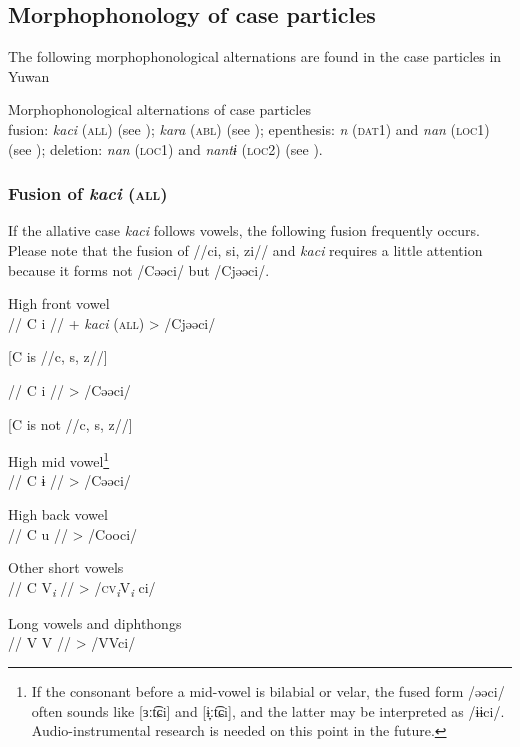 \subsection{Morphophonology of case particles}

The following morphophonological alternations are found in the case particles in Yuwan

\ea\label{ex:6-30} Morphophonological alternations of case particles\\
    \ea fusion:         \textit{kaci} (\textsc{all}) (see ); \textit{kara} (\textsc{abl}) (see );
    \ex epenthesis:         \textit{n} (\textsc{dat}1) and \textit{nan} (\textsc{loc1}) (see );
    \ex deletion:         \textit{nan} (\textsc{loc1}) and \textit{nantɨ} (\textsc{loc2}) (see ).
    \z
\z

\subsubsection{Fusion of \textit{kaci} (\textsc{all})}
\label{bkm:Ref365151806}
If the allative case \textit{kaci} follows vowels, the following fusion frequently occurs. Please note that the fusion of //ci, si, zi// and \textit{kaci} requires a little attention because it forms not /Cəəci/ but /Cjəəci/.

\ea\label{ex:6-31}
 \ea High front vowel\\
    //  C  i  //  +  \textit{kaci} (\textsc{all})  >  /Cjəəci/

    [C is //c, s, z//]

    //  C  i  //      >  /Cəəci/

    [C is not //c, s, z//]

\ex High mid vowel\footnote{If the consonant before a mid-vowel is bilabial or velar, the fused form /əəci/ often sounds like [ɜːt͡ɕi] and [ɨ̞ːt͡ɕi], and the latter may be interpreted as /ɨɨci/. Audio-instrumental research is needed on this point in the future.}\\
    //  C  ɨ  //      >  /Cəəci/

\ex High back vowel\\
\gll
    //  C  u  //      >  /Cooci/

\ex Other short vowels\\
\gll
    //  C  V\textit{\textsubscript{i}}  //      >  /\textsc{cv}\textit{\textsubscript{i}}V\textit{\textsubscript{i} }ci/

\ex Long vowels and diphthongs\\
\gll
    //  V  V  //      >  /VVci/

